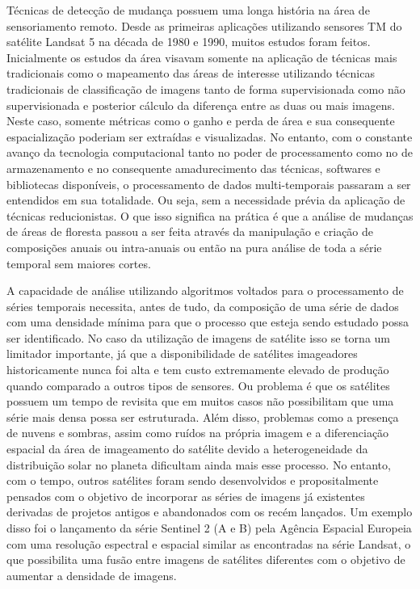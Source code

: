 \documentclass{article}
\begin{document}
Técnicas de detecção de mudança possuem uma longa história na área de sensoriamento remoto. Desde as primeiras aplicações utilizando sensores TM do satélite Landsat 5 na década de 1980 e 1990, muitos estudos foram feitos. Inicialmente os estudos da área visavam somente na aplicação de técnicas mais tradicionais como o mapeamento das áreas de interesse utilizando técnicas tradicionais de classificação de imagens tanto de forma supervisionada como não supervisionada e posterior cálculo da diferença entre as duas ou mais imagens. Neste caso, somente métricas como o ganho e perda de área e sua consequente espacialização poderiam ser extraídas e visualizadas. No entanto, com o constante avanço da tecnologia computacional tanto no poder de processamento como no de armazenamento e no consequente amadurecimento das técnicas, softwares e bibliotecas disponíveis, o processamento de dados multi-temporais passaram a ser entendidos em sua totalidade. Ou seja, sem a necessidade prévia da aplicação de técnicas reducionistas. O que isso significa na prática é que a análise de mudanças de áreas de floresta passou a ser feita através da manipulação e criação de composições anuais ou intra-anuais ou então na pura análise de toda a série temporal sem maiores cortes. 
\par
A capacidade de análise utilizando algoritmos voltados para o processamento de séries temporais necessita, antes de tudo, da composição de uma série de dados com uma densidade mínima para que o processo que esteja sendo estudado possa ser identificado. No caso da utilização de imagens de satélite isso se torna um limitador importante, já que a disponibilidade de satélites imageadores historicamente nunca foi alta e tem custo extremamente elevado de produção quando comparado a outros tipos de sensores. Ou problema é que os satélites possuem um tempo de revisita que em muitos casos não possibilitam que uma série mais densa possa ser estruturada. Além disso, problemas como a presença de nuvens e sombras, assim como ruídos na própria imagem e a diferenciação espacial da área de imageamento do satélite devido a heterogeneidade da distribuição solar no planeta dificultam ainda mais esse processo. No entanto, com o tempo, outros satélites foram sendo desenvolvidos e propositalmente pensados com o objetivo de incorporar as séries de imagens já existentes derivadas de projetos antigos e abandonados com os recém lançados. Um exemplo disso foi o lançamento da série Sentinel 2 (A e B) pela Agência Espacial Europeia com uma resolução espectral e espacial similar as encontradas na série Landsat, o que possibilita uma fusão entre imagens de satélites diferentes com o objetivo de aumentar a densidade de imagens. 
\end{document}
